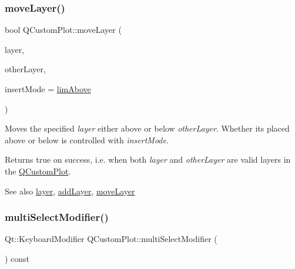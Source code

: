 \subsubsection{\texorpdfstring{moveLayer()}{moveLayer()}}
{\footnotesize\ttfamily bool Q\+Custom\+Plot\+::move\+Layer (\begin{DoxyParamCaption}\item[{\mbox{\hyperlink{class_q_c_p_layer}{Q\+C\+P\+Layer}} $\ast$}]{layer,  }\item[{\mbox{\hyperlink{class_q_c_p_layer}{Q\+C\+P\+Layer}} $\ast$}]{other\+Layer,  }\item[{\mbox{\hyperlink{class_q_custom_plot_a75a8afbe6ef333b1f3d47abb25b9add7}{Q\+Custom\+Plot\+::\+Layer\+Insert\+Mode}}}]{insert\+Mode = {\ttfamily \mbox{\hyperlink{class_q_custom_plot_a75a8afbe6ef333b1f3d47abb25b9add7a062b0b7825650b432a713c0df6742d41}{lim\+Above}}} }\end{DoxyParamCaption})}

Moves the specified {\itshape layer} either above or below {\itshape other\+Layer}. Whether it\textquotesingle{}s placed above or below is controlled with {\itshape insert\+Mode}.

Returns true on success, i.\+e. when both {\itshape layer} and {\itshape other\+Layer} are valid layers in the \mbox{\hyperlink{class_q_custom_plot}{Q\+Custom\+Plot}}.

\begin{DoxySeeAlso}{See also}
\mbox{\hyperlink{class_q_custom_plot_a0a96244e7773b242ef23c32b7bdfb159}{layer}}, \mbox{\hyperlink{class_q_custom_plot_ad5255393df078448bb6ac83fa5db5f52}{add\+Layer}}, \mbox{\hyperlink{class_q_custom_plot_ae896140beff19424e9e9e02d6e331104}{move\+Layer}} 
\end{DoxySeeAlso}
\mbox{\label{class_q_custom_plot_a28182402ed11609c9a429f0788162d18}} 
\subsubsection{\texorpdfstring{multiSelectModifier()}{multiSelectModifier()}}
{\footnotesize\ttfamily Qt\+::\+Keyboard\+Modifier Q\+Custom\+Plot\+::multi\+Select\+Modifier (\begin{DoxyParamCaption}{ }\end{DoxyParamCaption}) const\hspace{0.3cm}{\ttfamily [inline]}}

